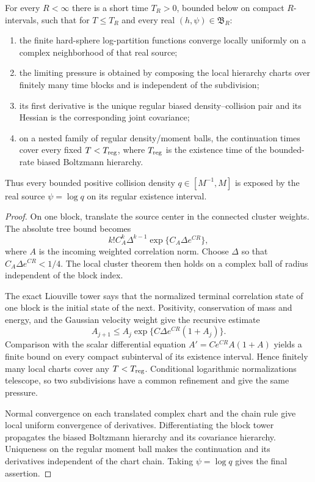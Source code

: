 \begin{theorem}
\label{thm:r3-b2-source-continuation}
For every \(R<\infty\) there is a short time
\(T_R>0\), bounded below on compact \(R\)-intervals, such that for
\(T\le T_R\) and every real \((h,\psi)\in\mathfrak B_R\):
\begin{enumerate}[label=(\roman*)]
\item the finite hard-sphere log-partition functions converge locally
      uniformly on a complex neighborhood of that real source;
\item the limiting pressure is obtained by composing the local hierarchy
      charts over finitely many time blocks and is independent of the
      subdivision;
\item its first derivative is the unique regular biased density--collision
      pair and its Hessian is the corresponding joint covariance;
\item on a nested family of regular density/moment balls, the continuation
      times cover every fixed \(T<T_{\rm reg}\), where \(T_{\rm reg}\) is the
      existence time of the bounded-rate biased Boltzmann hierarchy.
\end{enumerate}
Thus every bounded positive collision density
\(q\in[M^{-1},M]\) is exposed by the real source \(\psi=\log q\) on its
regular existence interval.
\end{theorem}

\begin{proof}
On one block, translate the source center in the connected cluster weights.
The absolute tree bound becomes
\[
 k!C_A^k\Delta^{k-1}
 \exp\{C_A\Delta e^{CR}\},
\]
where \(A\) is the incoming weighted correlation norm.  Choose
\(\Delta\) so that \(C_A\Delta e^{CR}<1/4\).  The local cluster theorem then
holds on a complex ball of radius independent of the block index.

The exact Liouville tower says that the normalized terminal correlation state
of one block is the initial state of the next.  Positivity, conservation of
mass and energy, and the Gaussian velocity weight give the recursive estimate
\[
 A_{j+1}\le A_j\exp\{C\Delta e^{CR}(1+A_j)\}.
\]
Comparison with the scalar differential equation
\(A'=Ce^{CR}A(1+A)\) yields a finite bound on every compact subinterval of its
existence interval.  Hence finitely many local charts cover any
\(T<T_{\rm reg}\).  Conditional logarithmic normalizations telescope, so two
subdivisions have a common refinement and give the same pressure.

Normal convergence on each translated complex chart and the chain rule give
local uniform convergence of derivatives.  Differentiating the block tower
propagates the biased Boltzmann hierarchy and its covariance hierarchy.
Uniqueness on the regular moment ball makes the continuation and its
derivatives independent of the chart chain.  Taking
\(\psi=\log q\) gives the final assertion.
\end{proof}

